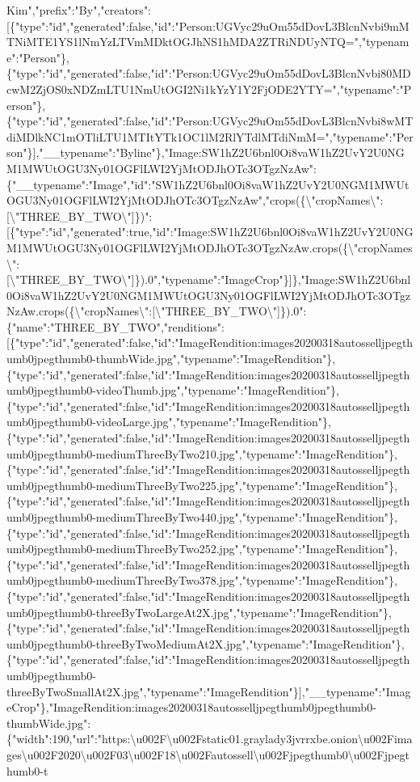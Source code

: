 Kim","prefix":"By","creators":{[}\{"type":"id","generated":false,"id":"Person:UGVyc29uOm55dDovL3BlcnNvbi9mMTNiMTE1YS1lNmYzLTVmMDktOGJhNS1hMDA2ZTRiNDUyNTQ=","typename":"Person"\},\{"type":"id","generated":false,"id":"Person:UGVyc29uOm55dDovL3BlcnNvbi80MDcwM2ZjOS0xNDZmLTU1NmUtOGI2Ni1kYzY1Y2FjODE2YTY=","typename":"Person"\},\{"type":"id","generated":false,"id":"Person:UGVyc29uOm55dDovL3BlcnNvbi8wMTdiMDlkNC1mOTliLTU1MTItYTk1OC1lM2RlYTdlMTdiNmM=","typename":"Person"\}{]},"\_\_typename":"Byline"\},"Image:SW1hZ2U6bnl0Oi8vaW1hZ2UvY2U0NGM1MWUtOGU3Ny01OGFlLWI2YjMtODJhOTc3OTgzNzAw":\{"\_\_typename":"Image","id":"SW1hZ2U6bnl0Oi8vaW1hZ2UvY2U0NGM1MWUtOGU3Ny01OGFlLWI2YjMtODJhOTc3OTgzNzAw","crops(\{\textbackslash{}"cropNames\textbackslash{}":{[}\textbackslash{}"THREE\_BY\_TWO\textbackslash{}"{]}\})":{[}\{"type":"id","generated":true,"id":"Image:SW1hZ2U6bnl0Oi8vaW1hZ2UvY2U0NGM1MWUtOGU3Ny01OGFlLWI2YjMtODJhOTc3OTgzNzAw.crops(\{\textbackslash{}"cropNames\textbackslash{}":{[}\textbackslash{}"THREE\_BY\_TWO\textbackslash{}"{]}\}).0","typename":"ImageCrop"\}{]}\},"Image:SW1hZ2U6bnl0Oi8vaW1hZ2UvY2U0NGM1MWUtOGU3Ny01OGFlLWI2YjMtODJhOTc3OTgzNzAw.crops(\{\textbackslash{}"cropNames\textbackslash{}":{[}\textbackslash{}"THREE\_BY\_TWO\textbackslash{}"{]}\}).0":\{"name":"THREE\_BY\_TWO","renditions":{[}\{"type":"id","generated":false,"id":"ImageRendition:images20200318autosselljpegthumb0jpegthumb0-thumbWide.jpg","typename":"ImageRendition"\},\{"type":"id","generated":false,"id":"ImageRendition:images20200318autosselljpegthumb0jpegthumb0-videoThumb.jpg","typename":"ImageRendition"\},\{"type":"id","generated":false,"id":"ImageRendition:images20200318autosselljpegthumb0jpegthumb0-videoLarge.jpg","typename":"ImageRendition"\},\{"type":"id","generated":false,"id":"ImageRendition:images20200318autosselljpegthumb0jpegthumb0-mediumThreeByTwo210.jpg","typename":"ImageRendition"\},\{"type":"id","generated":false,"id":"ImageRendition:images20200318autosselljpegthumb0jpegthumb0-mediumThreeByTwo225.jpg","typename":"ImageRendition"\},\{"type":"id","generated":false,"id":"ImageRendition:images20200318autosselljpegthumb0jpegthumb0-mediumThreeByTwo440.jpg","typename":"ImageRendition"\},\{"type":"id","generated":false,"id":"ImageRendition:images20200318autosselljpegthumb0jpegthumb0-mediumThreeByTwo252.jpg","typename":"ImageRendition"\},\{"type":"id","generated":false,"id":"ImageRendition:images20200318autosselljpegthumb0jpegthumb0-mediumThreeByTwo378.jpg","typename":"ImageRendition"\},\{"type":"id","generated":false,"id":"ImageRendition:images20200318autosselljpegthumb0jpegthumb0-threeByTwoLargeAt2X.jpg","typename":"ImageRendition"\},\{"type":"id","generated":false,"id":"ImageRendition:images20200318autosselljpegthumb0jpegthumb0-threeByTwoMediumAt2X.jpg","typename":"ImageRendition"\},\{"type":"id","generated":false,"id":"ImageRendition:images20200318autosselljpegthumb0jpegthumb0-threeByTwoSmallAt2X.jpg","typename":"ImageRendition"\}{]},"\_\_typename":"ImageCrop"\},"ImageRendition:images20200318autosselljpegthumb0jpegthumb0-thumbWide.jpg":\{"width":190,"url":"https:\textbackslash{}u002F\textbackslash{}u002Fstatic01.graylady3jvrrxbe.onion\textbackslash{}u002Fimages\textbackslash{}u002F2020\textbackslash{}u002F03\textbackslash{}u002F18\textbackslash{}u002Fautossell\textbackslash{}u002Fjpegthumb0\textbackslash{}u002Fjpegthumb0-t